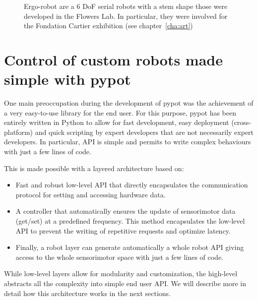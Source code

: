 \begin{figure}[tb]
\centering
    \hfil
    \caption{Ergo-robot are a 6 DoF serial robots with a stem shape those were developed in the Flowers Lab. In particular, they were involved for the Fondation Cartier exhibition (see chapter~\ref{cha:art})}
    \label{fig:ergo-robot}
\end{figure}


\section{Control of custom robots made simple with pypot} %

One main preoccupation during the development of pypot was the achievement of a very easy-to-use library for the end user. For this purpose, pypot has been entirely written in Python to allow for fast development, easy deployment (cross-platform) and quick scripting by expert developers that are not necessarily expert developers. In particular, API is simple and permits to write complex behaviours with just a few lines of code.

This is made possible with a layered architecture based on:

\begin{itemize}
    \item Fast and robust low-level API that directly encapsulates the communication protocol for setting and accessing hardware data.
    \item A controller that automatically ensures the update of sensorimotor data (get/set) at a predefined frequency. This method encapsulates the low-level API to prevent the writing of repetitive requests and optimize latency.
    \item Finally, a robot layer can generate automatically a whole robot API giving access to the whole sensorimotor space with just a few lines of code.
\end{itemize}

While low-level layers allow for modularity and customization, the high-level abstracts all the complexity into simple end user API. We will describe more in detail how this architecture works in the next sections.


